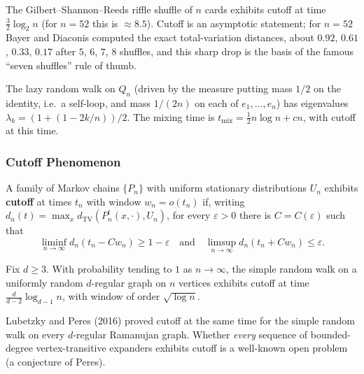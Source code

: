 \begin{example}
The Gilbert--Shannon--Reeds riffle shuffle of $n$ cards exhibits
cutoff at time $\tfrac{3}{2} \log_2 n$ (for $n = 52$ this is
$\approx 8.5$). Cutoff is an asymptotic statement; for $n = 52$ Bayer
and Diaconis computed the exact total-variation distances, about
$0.92$, $0.61$, $0.33$, $0.17$ after $5$, $6$, $7$, $8$ shuffles, and
this sharp drop is the basis of the famous ``seven shuffles'' rule of
thumb.
\end{example}

\begin{example}
The lazy random walk on $Q_n$ (driven by the measure putting mass
$1/2$ on the identity, i.e.\ a self-loop, and mass $1/(2n)$ on each of
$e_1, \ldots, e_n$) has eigenvalues
$\lambda_k = (1 + (1 - 2k/n))/2$. The mixing time is
$t_{\mathrm{mix}} = \tfrac{1}{2} n \log n + c n$, with cutoff at this
time.
\end{example}

\subsubsection{Cutoff Phenomenon}

\begin{definition}[Cutoff]\label{def:cutoff}
A family of Markov chains $\{P_n\}$ with uniform stationary
distributions $U_n$ exhibits \textbf{cutoff} at times $t_n$ with window
$w_n = o(t_n)$ if, writing
$d_n(t) = \max_x d_{\mathrm{TV}}(P_n^{t}(x, \cdot), U_n)$, for every
$\varepsilon > 0$ there is $C = C(\varepsilon)$ such that
\[
  \liminf_{n \to \infty} d_n(t_n - C w_n) \ge 1 - \varepsilon
  \quad\text{and}\quad
  \limsup_{n \to \infty} d_n(t_n + C w_n) \le \varepsilon .
\]
\end{definition}

\begin{theorem}
Fix $d \ge 3$. With probability tending to $1$ as $n \to \infty$, the
simple random walk on a uniformly random $d$-regular graph on $n$
vertices exhibits cutoff at time $\frac{d}{d-2} \log_{d-1} n$, with
window of order $\sqrt{\log n}$.
\end{theorem}

\begin{remark}
Lubetzky and Peres (2016) proved cutoff at the same time for the
simple random walk on every $d$-regular Ramanujan graph. Whether
\emph{every} sequence of bounded-degree vertex-transitive expanders
exhibits cutoff is a well-known open problem (a conjecture of Peres).
\end{remark}

